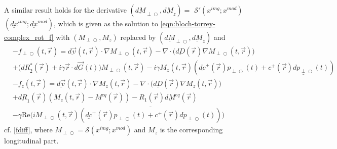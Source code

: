 \documentclass{ws-m3as}
\newcommand{\uld}[1]{\underline{d#1}}
\renewcommand\Re{\mathrm{Re}}
\def\Mpp{M_{\perp\!\!\!\!\!\bigcirc}}
\def\pp{p_{\perp\!\!\!\!\!\bigcirc}}
\def\uldMpp{\uld{M}_{\perp\!\!\!\!\!\bigcirc}}
\def\fpp{f_{\perp\!\!\!\!\!\bigcirc}}
\begin{document}
A similar result holds for the derivative $(\uldMpp,\uld{M}_z)=$ $\mathcal{S}'(x^{img};x^{mod})$ $(\uld{x}^{img};\uld{x}^{mod})$, which is given as the solution to \eqref{eqn:bloch-torrey-complex_rot_f} with $(\Mpp,M_z)$ replaced by $(\uldMpp,\uld{M}_z)$ and
\begin{equation}\label{fderiv}
\begin{aligned}
&-\fpp(t, \vec r)= 
\uld{\vec v}(t, \vec r)\cdot\nabla \Mpp(t, \vec r) 
-\nabla\cdot\bigl(\uld{D}(\vec r) \nabla \Mpp(t, \vec r)\bigr) \\
&+\bigl(\uld{R}_2^*(\vec r)+i\gamma\vec r \cdot \uld{\vec G}(t)\bigr)\Mpp(t, \vec r)
-i\gamma M_z(t, \vec r)(\uld{c}^+(\vec r)\pp(t)+c^+(\vec r)\uld{\pp}(t))
\\[1ex]    
&-f_z(t, \vec r)=\uld{\vec v}(t, \vec r)\cdot\nabla M_z(t, \vec r) -\nabla\cdot\bigl(\uld{D}(\vec r) \nabla M_z(t, \vec r)\bigr) \\
&+\uld{R}_1(\vec r) (M_z(t, \vec r)-M^{eq}(\vec r))-R_1(\vec r) \uld{M}^{eq}(\vec r)\\
&-\gamma\Re\bigl(i\Mpp(t, \vec r)\overline{(\uld{c}^+(\vec r)\pp(t)+c^+(\vec r)\uld{\pp}(t))}\bigr)
\end{aligned}
\end{equation}
cf. \eqref{fdiff}, where $\Mpp=\mathcal{S}(x^{img};x^{mod})$ and $M_z$ is the corresponding longitudinal part.
\end{document}
